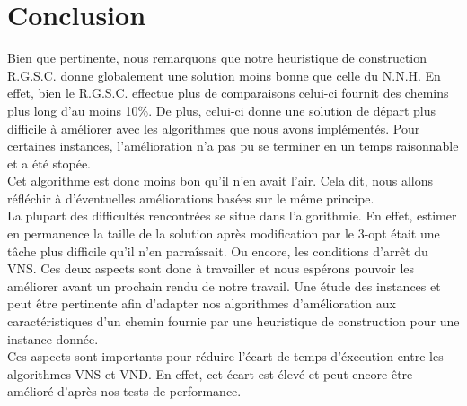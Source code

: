 \documentclass[12pt,a4paper]{article}
\begin{document}
\section{Conclusion}
Bien que pertinente, nous remarquons que notre heuristique de construction R.G.S.C. donne globalement une solution moins bonne que celle du N.N.H. En effet, bien le R.G.S.C. effectue plus de comparaisons celui-ci fournit des chemins plus long d'au moins 10\%. De plus, celui-ci donne une solution de départ plus difficile à améliorer avec les algorithmes que nous avons implémentés. Pour certaines instances, l'amélioration n'a pas pu se terminer en un temps raisonnable et a été stopée.\\
Cet algorithme est donc moins bon qu'il n'en avait l'air. Cela dit, nous allons réfléchir à d'éventuelles améliorations basées sur le même principe.\\
La plupart des difficultés rencontrées se situe dans l'algorithmie. En effet, estimer en permanence la taille de la solution après modification par le 3-opt était une tâche plus difficile qu'il n'en parraîssait. Ou encore, les conditions d'arrêt du VNS. Ces deux aspects sont donc à travailler et nous espérons pouvoir les améliorer avant un prochain rendu de notre travail. Une étude des instances et peut être pertinente afin d'adapter nos algorithmes d'amélioration aux caractéristiques d'un chemin fournie par une heuristique de construction pour une instance donnée.\\
Ces aspects sont importants pour réduire l'écart de temps d'éxecution entre les algorithmes VNS et VND. En effet, cet écart est élevé et peut encore être amélioré d'après nos tests de performance.\\
\end{document}
